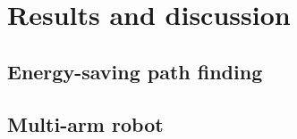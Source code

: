 \chapter{Results and discussion}
\label{cha:result}

\section{Energy-saving path finding}
\label{sec:result_project1}

\section{Multi-arm robot}
\label{sec:result_project2}